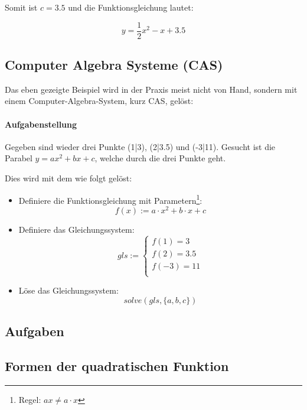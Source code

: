 Somit ist $c=3.5$ und die Funktionsgleichung lautet:

$$y = \frac{1}{2}x^2 - x + 3.5$$


\newpage


\subsection{Computer Algebra Systeme (CAS)}
Das eben gezeigte Beispiel wird in der Praxis meist nicht von Hand,
sondern mit einem Computer-Algebra-System, kurz CAS, gelöst:

\paragraph{Aufgabenstellung}
Gegeben sind wieder drei Punkte (1|3), (2|3.5) und (-3|11).
Gesucht ist die Parabel $y = ax^2 + bx + c$, welche durch die drei
Punkte geht.

Dies wird mit dem \tinspire{} wie folgt gelöst:
\begin{itemize}
\item Definiere die Funktionsgleichung mit
  Parametern\footnote{\tinspire Regel: $ax\ne a\cdot{} x$}:\\
  $$f(x) := a\cdot{}x^2 + b\cdot{}x + c$$
\item Definiere das Gleichungssystem:
  $$gls := \left\{ \begin{array}{l}
    f(1) = 3\\
    f(2) = 3.5\\
    f(-3)= 11\\
  \end{array}\right.$$
\item Löse das Gleichungssystem:
  $$solve(gls,\{a, b, c\})$$
\end{itemize}

\subsection*{Aufgaben}

\newpage

\subsection{Formen der quadratischen Funktion}
